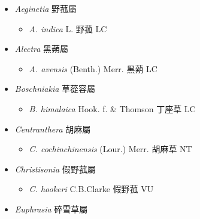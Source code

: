 
  \begin{itemize}
 \item[] \textit{Aeginetia} 野菰屬
                                
  \begin{itemize}
        \item[] \textit{A. indica} L.  野菰   LC
  \end{itemize}
 \item[] \textit{Alectra} 黑蒴屬
                                
  \begin{itemize}
        \item[] \textit{A. avensis} (Benth.) Merr.  黑蒴   LC
  \end{itemize}
 \item[] \textit{Boschniakia} 草蓯容屬
                                
  \begin{itemize}
        \item[] \textit{B. himalaica} Hook. f. \& Thomson  丁座草   LC
  \end{itemize}
 \item[] \textit{Centranthera} 胡麻屬
                                
  \begin{itemize}
        \item[] \textit{C. cochinchinensis} (Lour.) Merr.  胡麻草   NT
  \end{itemize}
 \item[] \textit{Christisonia} 假野菰屬
                                
  \begin{itemize}
        \item[] \textit{C. hookeri} C.B.Clarke  假野菰   VU
  \end{itemize}
 \item[] \textit{Euphrasia} 碎雪草屬
                                

\end{itemize}

